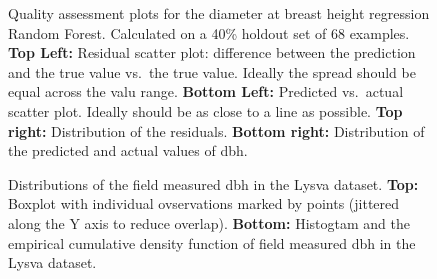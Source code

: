 \begin{figure}
\caption[Quality assessment plots for the dbh regression Random Forest.]{\label{fig-reg-residuals}Quality assessment plots for the
diameter at breast height regression Random Forest. Calculated on a 40\%
holdout set of 68 examples. \textbf{Top Left:} Residual scatter plot:
difference between the prediction and the true value vs.~the true value.
Ideally the spread should be equal across the valu range. \textbf{Bottom
Left:} Predicted vs.~actual scatter plot. Ideally should be as close to
a line as possible. \textbf{Top right:} Distribution of the residuals.
\textbf{Bottom right:} Distribution of the predicted and actual values
of dbh.}
\end{figure}

\begin{figure}
\caption[Distribution of field mesured dbh in the Lysva dataset.]{\label{fig-reg-residuals}
    Distributions of the field measured dbh in the Lysva dataset.
    \textbf{Top:} Boxplot with individual ovservations marked by points (jittered along the Y axis to reduce overlap). 
    \textbf{Bottom:} Histogtam and the empirical cumulative density function of field measured dbh in the Lysva dataset. 
}
\end{figure}

